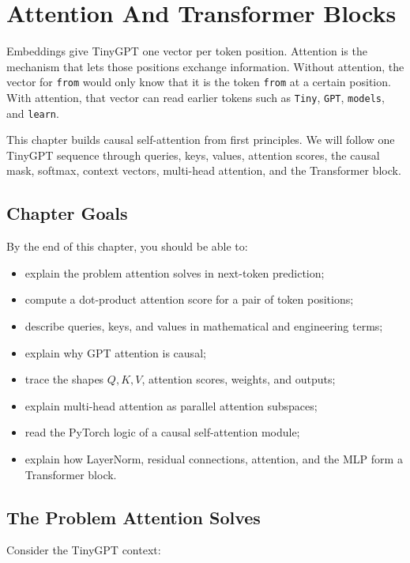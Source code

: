 \chapter{Attention And Transformer Blocks}

Embeddings give TinyGPT one vector per token position. Attention is the mechanism that lets those positions exchange information. Without attention, the vector for \texttt{from} would only know that it is the token \texttt{from} at a certain position. With attention, that vector can read earlier tokens such as \texttt{Tiny}, \texttt{GPT}, \texttt{models}, and \texttt{learn}.

This chapter builds causal self-attention from first principles. We will follow one TinyGPT sequence through queries, keys, values, attention scores, the causal mask, softmax, context vectors, multi-head attention, and the Transformer block.

\section{Chapter Goals}

By the end of this chapter, you should be able to:

\begin{itemize}
  \item explain the problem attention solves in next-token prediction;
  \item compute a dot-product attention score for a pair of token positions;
  \item describe queries, keys, and values in mathematical and engineering terms;
  \item explain why GPT attention is causal;
  \item trace the shapes \(Q,K,V\), attention scores, weights, and outputs;
  \item explain multi-head attention as parallel attention subspaces;
  \item read the PyTorch logic of a causal self-attention module;
  \item explain how LayerNorm, residual connections, attention, and the MLP form a Transformer block.
\end{itemize}

\section{The Problem Attention Solves}

Consider the TinyGPT context:

